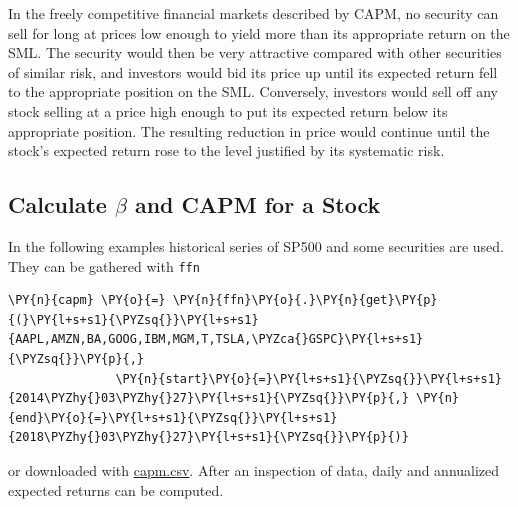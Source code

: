 In the freely competitive financial markets described by CAPM, no security can sell for long at prices low enough to yield more than its appropriate return on the SML. The security would then be very attractive compared with other securities of similar risk, and investors would bid its price up until its expected return fell to the appropriate position on the SML. Conversely, investors would sell off any stock selling at a price high enough to put its expected return below its appropriate position. The resulting reduction in price would continue until the stock’s expected return rose to the level justified by its systematic risk.

\subsection{Calculate $\beta$ and CAPM for a Stock}

In the following examples historical series of SP500 and some securities are used. They can be gathered with \texttt{ffn}


\begin{codebox}
\begin{Verbatim}[commandchars=\\\{\}]
\PY{n}{capm} \PY{o}{=} \PY{n}{ffn}\PY{o}{.}\PY{n}{get}\PY{p}{(}\PY{l+s+s1}{\PYZsq{}}\PY{l+s+s1}{AAPL,AMZN,BA,GOOG,IBM,MGM,T,TSLA,\PYZca{}GSPC}\PY{l+s+s1}{\PYZsq{}}\PY{p}{,}
               \PY{n}{start}\PY{o}{=}\PY{l+s+s1}{\PYZsq{}}\PY{l+s+s1}{2014\PYZhy{}03\PYZhy{}27}\PY{l+s+s1}{\PYZsq{}}\PY{p}{,} \PY{n}{end}\PY{o}{=}\PY{l+s+s1}{\PYZsq{}}\PY{l+s+s1}{2018\PYZhy{}03\PYZhy{}27}\PY{l+s+s1}{\PYZsq{}}\PY{p}{)}
\end{Verbatim}
\end{codebox}
\noindent
or downloaded with \href{https://raw.githubusercontent.com/matteosan1/finance_course/develop/libro/input_files/capm.csv}{capm.csv}.
After an inspection of data, daily and annualized expected returns can be computed.

